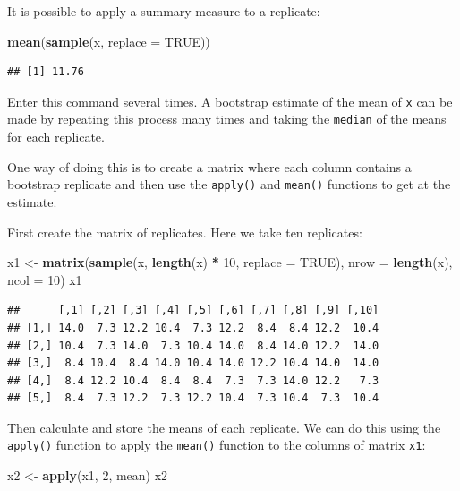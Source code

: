 \documentclass[12pt,a4paper]{book}
\newenvironment{Shaded}{\begin{snugshade}}{\end{snugshade}}
\newcommand{\DataTypeTok}[1]{\textcolor[rgb]{0.13,0.29,0.53}{#1}}
\newcommand{\DecValTok}[1]{\textcolor[rgb]{0.00,0.00,0.81}{#1}}
\newcommand{\KeywordTok}[1]{\textcolor[rgb]{0.13,0.29,0.53}{\textbf{#1}}}
\newcommand{\NormalTok}[1]{#1}
\newcommand{\OperatorTok}[1]{\textcolor[rgb]{0.81,0.36,0.00}{\textbf{#1}}}
\newcommand{\OtherTok}[1]{\textcolor[rgb]{0.56,0.35,0.01}{#1}}
\newcommand{\StringTok}[1]{\textcolor[rgb]{0.31,0.60,0.02}{#1}}
\theoremstyle{definition}
\theoremstyle{definition}
\theoremstyle{definition}
\theoremstyle{remark}
\begin{document}
It is possible to apply a summary measure to a replicate:

\begin{Shaded}
\begin{Highlighting}[]
\KeywordTok{mean}\NormalTok{(}\KeywordTok{sample}\NormalTok{(x, }\DataTypeTok{replace =} \OtherTok{TRUE}\NormalTok{))}
\end{Highlighting}
\end{Shaded}

\begin{verbatim}
## [1] 11.76
\end{verbatim}

Enter this command several times. A bootstrap estimate of the mean of
\texttt{x} can be made by repeating this process many times and taking
the \texttt{median} of the means for each replicate.

One way of doing this is to create a matrix where each column contains a
bootstrap replicate and then use the \texttt{apply()} and
\texttt{mean()} functions to get at the estimate.

First create the matrix of replicates. Here we take ten replicates:

\begin{Shaded}
\begin{Highlighting}[]
\NormalTok{x1 <-}\StringTok{ }\KeywordTok{matrix}\NormalTok{(}\KeywordTok{sample}\NormalTok{(x, }\KeywordTok{length}\NormalTok{(x) }\OperatorTok{*}\StringTok{ }\DecValTok{10}\NormalTok{, }\DataTypeTok{replace =} \OtherTok{TRUE}\NormalTok{),}
             \DataTypeTok{nrow =} \KeywordTok{length}\NormalTok{(x), }\DataTypeTok{ncol =} \DecValTok{10}\NormalTok{)}
\NormalTok{x1}
\end{Highlighting}
\end{Shaded}

\begin{verbatim}
##      [,1] [,2] [,3] [,4] [,5] [,6] [,7] [,8] [,9] [,10]
## [1,] 14.0  7.3 12.2 10.4  7.3 12.2  8.4  8.4 12.2  10.4
## [2,] 10.4  7.3 14.0  7.3 10.4 14.0  8.4 14.0 12.2  14.0
## [3,]  8.4 10.4  8.4 14.0 10.4 14.0 12.2 10.4 14.0  14.0
## [4,]  8.4 12.2 10.4  8.4  8.4  7.3  7.3 14.0 12.2   7.3
## [5,]  8.4  7.3 12.2  7.3 12.2 10.4  7.3 10.4  7.3  10.4
\end{verbatim}

Then calculate and store the means of each replicate. We can do this
using the \texttt{apply()} function to apply the \texttt{mean()}
function to the columns of matrix \texttt{x1}:

\begin{Shaded}
\begin{Highlighting}[]
\NormalTok{x2 <-}\StringTok{ }\KeywordTok{apply}\NormalTok{(x1, }\DecValTok{2}\NormalTok{, mean)}
\NormalTok{x2}
\end{Highlighting}
\end{Shaded}
\end{document}

